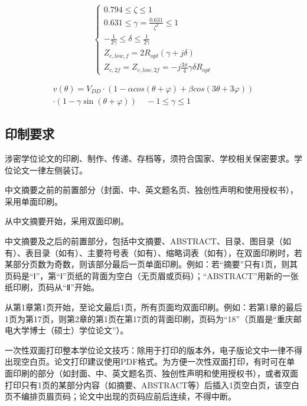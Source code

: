 \begin{equation}
\left\{ \begin{aligned}
0.794 \le \zeta  \le 1 ~~~~~~~~~~~\\
0.631 \le \gamma  = \frac{{0.631}}{{{\zeta ^2}}} \le 1~~~~~~ \\
- \frac{1}{{2\gamma }} \le \delta  \le \frac{1}{{2\gamma }}~~~~~~~~~~~ \\
{Z_{c,low,f}} = 2{R_{opt}}(\gamma  + j\delta )~~~~~\\
{Z_{c,2f}} = {Z_{c,low,2f}} =  - j\frac{{3\pi }}{4}\gamma \delta {R_{opt}}
\end{aligned} \right.
\label{eq:3.1}
\end{equation}

\begin{equation}
\begin{aligned}
v(\theta ) = V_{DD}\cdot(1 - \alpha cos(\theta  + \varphi ) + \beta cos(3\theta  + 3\varphi ))\\
\cdot(1 - \gamma \sin (\theta  + \varphi )) ~~~~~- 1 \le \gamma  \le 1\
\end{aligned}
\label{eq:vd}
\end{equation}

\subsection{印制要求}
涉密学位论文的印刷、制作、传递、存档等，须符合国家、学校相关保密要求。学位论文一律左侧装订。

中文摘要之前的前置部分（封面、中、英文题名页、独创性声明和使用授权书），采用单面印刷。

从中文摘要开始，采用双面印刷。

中文摘要及之后的前置部分，包括中文摘要、ABSTRACT、目录、图目录（如有）、表目录（如有）、主要符号表（如有）、缩略词表（如有），在双面印刷时，若某部分页数为奇数，则该部分最后一页单面印刷。例如：若“摘要”只有1页，则其页码是“Ⅰ”，第“Ⅰ”页纸的背面为空白（无页眉或页码）；“ABSTRACT”用新的一张纸印刷，页码从“Ⅱ”开始。

从第1章第1页开始，至论文最后1页，所有页面均双面印刷。例如：若第1章的最后1页为第17页，则第2章的第1页在第17页的背面印刷，页码为“18”（页眉是“重庆邮电大学博士（硕士）学位论文”）。

一次性双面打印整本学位论文技巧：除用于打印的版本外，电子版论文中一律不得出现空白页。论文打印建议使用PDF格式。为方便一次性双面打印，有时可在单面印刷的部分（如封面、中、英文题名页、独创性声明和使用授权书），或者双面打印只有1页的某部分内容（如摘要、ABSTRACT等）后插入1页空白页，该空白页不编排页眉页码；论文中出现的页码应前后连续，不得中断。

